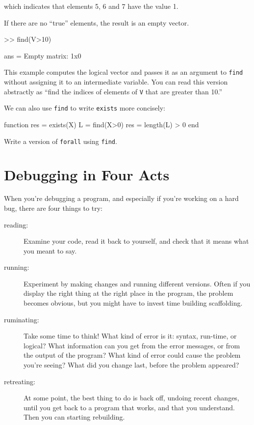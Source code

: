 which indicates that elements 5, 6 and 7 have the value 1.

If there are no ``true'' elements, the result is an empty vector.

\begin{code}
>> find(V>10)

ans = Empty matrix: 1x0
\end{code}

This example computes the logical vector and passes it as an
argument to {\tt find} without assigning it to an intermediate
variable.  You can read this version abstractly as ``find
the indices of elements of {\tt V} that are greater than 10.''

We can also use {\tt find} to write {\tt exists} more concisely:

\begin{code}
function res = exists(X)
    L = find(X>0)
    res = length(L) > 0
end
\end{code}

\begin{ex}
Write a version of {\tt forall} using {\tt find}.
\end{ex}


\section{Debugging in Four Acts}


When you're debugging a program, and especially if you're working on a hard bug, there are four things to try:

\begin{description}

\item[reading:] Examine your code, read it back to yourself, and
check that it means what you meant to say.

\item[running:] Experiment by making changes and running different
versions.  Often if you display the right thing at the right place
in the program, the problem becomes obvious, but you might have to invest time building scaffolding.

\item[ruminating:] Take some time to think!  What kind of error
is it: syntax, run-time, or logical?  What information can you get from
the error messages, or from the output of the program?  What kind of
error could cause the problem you're seeing?  What did you change
last, before the problem appeared?

\item[retreating:] At some point, the best thing to do is back
off, undoing recent changes, until you get back to a program that
works, and that you understand.  Then you can starting rebuilding.

\end{description}

